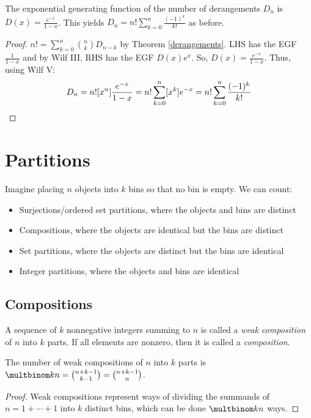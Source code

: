\documentclass[a4paper]{article}
\begin{document}
\begin{proposition}
The exponential generating function of the number of derangements $D_n$ is $D(x)=\frac{e^{-x}}{1-x}$. This yields $D_n=n!\sum_{k=0}^n\frac{(-1)^k}{k!}$ as before.

\begin{hl}
\begin{proof}
$n!=\sum_{k=0}^n\binom nkD_{n-k}$ by Theorem \ref{derangements}. LHS has the EGF $\frac1{1-x}$ and by Wilf III, RHS has the EGF $D(x)e^x$. So, $D(x)=\frac{e^{-x}}{1-x}$. Thus, using Wilf V:
\begin{equation*}
D_n=n![x^n]\frac{e^{-x}}{1-x}
=n!\sum_{k=0}^n[x^k]e^{-x}
=n!\sum_{k=0}^n\frac{(-1)^k}{k!}\qedhere
\end{equation*}
\end{proof}
\end{hl}
\end{proposition}


\section{Partitions}

\begin{concept}
Imagine placing $n$ objects into $k$ bins so that no bin is empty. We can count:
\begin{itemize}
\item Surjections/ordered set partitions, where the objects and bins are distinct
\item Compositions, where the objects are identical but the bins are distinct
\item Set partitions, where the objects are distinct but the bins are identical
\item Integer partitions, where the objects and bins are identical
\end{itemize}
\end{concept}

\subsection{Compositions}

\begin{definition}
A sequence of $k$ nonnegative integers summing to $n$ is called a \emph{weak composition} of $n$ into $k$ parts. If all elements are nonzero, then it is called a \emph{composition}.
\end{definition}

\begin{theorem}
The number of weak compositions of $n$ into $k$ parts is $\multbinom kn=\binom{n+k-1}{k-1}=\binom{n+k-1}n$.

\begin{hl}
\begin{proof}
Weak compositions represent ways of dividing the summands of $n=1+\cdots+1$ into $k$ distinct bins, which can be done $\multbinom kn$ ways.
\end{proof}
\end{hl}
\end{theorem}
\end{document}
